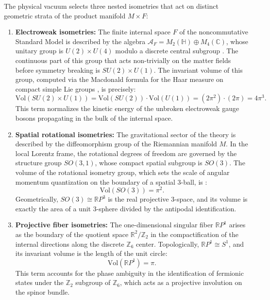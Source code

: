 \documentclass[12pt,a4paper]{article}
\begin{document}
The physical vacuum selects three nested isometries that act on distinct geometric strata of the product manifold $M \times F$:

\begin{enumerate}
    \item \textbf{Electroweak isometries:} The finite internal space $F$ of the noncommutative Standard Model is described by the algebra $\mathcal{A}_F = M_2(\mathbb{H}) \oplus M_4(\mathbb{C})$, whose unitary group is $U(2) \times U(4)$ modulo a discrete central subgroup \cite{chamseddine1997}. The continuous part of this group that acts non-trivially on the matter fields before symmetry breaking is $SU(2) \times U(1)$. The invariant volume of this group, computed via the Macdonald formula for the Haar measure on compact simple Lie groups \cite{macdonald1980}, is precisely:
    \begin{equation}
    \text{Vol}(SU(2) \times U(1)) = \text{Vol}(SU(2)) \cdot \text{Vol}(U(1)) = (2\pi^2) \cdot (2\pi) = 4\pi^3.
    \end{equation}
    This term normalizes the kinetic energy of the unbroken electroweak gauge bosons propagating in the bulk of the internal space.

    \item \textbf{Spatial rotational isometries:} The gravitational sector of the theory is described by the diffeomorphism group of the Riemannian manifold $M$. In the local Lorentz frame, the rotational degrees of freedom are governed by the structure group $SO(3,1)$, whose compact spatial subgroup is $SO(3)$. The volume of the rotational isometry group, which sets the scale of angular momentum quantization on the boundary of a spatial 3-ball, is \cite{macdonald1980}:
    \begin{equation}
    \text{Vol}(SO(3)) = \pi^2.
    \end{equation}
    Geometrically, $SO(3) \cong \mathbb{R}P^3$ is the real projective 3-space, and its volume is exactly the area of a unit 3-sphere divided by the antipodal identification.

    \item \textbf{Projective fiber isometries:} The one-dimensional singular fiber $\mathbb{R}P^1$ arises as the boundary of the quotient space $\mathbb{R}^2/\mathbb{Z}_2$ in the compactification of the internal directions along the discrete $\mathbb{Z}_6$ center. Topologically, $\mathbb{R}P^1 \cong S^1$, and its invariant volume is the length of the unit circle:
    \begin{equation}
    \text{Vol}(\mathbb{R}P^1) = \pi.
    \end{equation}
    This term accounts for the phase ambiguity in the identification of fermionic states under the $\mathbb{Z}_2$ subgroup of $\mathbb{Z}_6$, which acts as a projective involution on the spinor bundle.
\end{enumerate}
\end{document}
